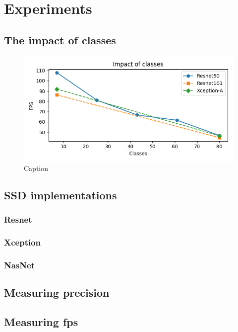 \chapter{Experiments}


\section{The impact of classes}
\begin{figure}
    \centering
    \includegraphics[width=\textwidth]{img/fps_class}
    \caption{Caption}
    \label{fig:fpscls}
\end{figure}

\section{SSD implementations}
\subsection{Resnet}
\subsection{Xception}
\subsection{NasNet}

\section{Measuring precision}

\section{Measuring fps}
